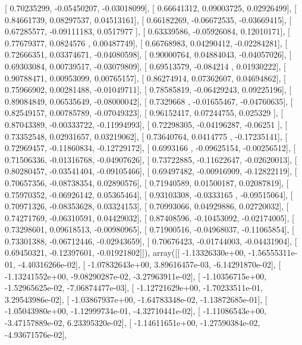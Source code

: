 \documentclass{article}
\begin{document}
       [ 0.70235299, -0.05450207, -0.03018099],
       [ 0.66641312,  0.09003725,  0.02926499],
       [ 0.84661739,  0.08297537,  0.04513161],
       [ 0.66182269, -0.06672535, -0.03669415],
       [ 0.67285577, -0.09111183,  0.0517977 ],
       [ 0.63339586, -0.05926084,  0.12010171],
       [ 0.77679377,  0.0824576 ,  0.00487749],
       [ 0.66768983,  0.04290412, -0.02284281],
       [ 0.72666351,  0.03374671, -0.04080598],
       [ 0.90000764,  0.04884043, -0.04057026],
       [ 0.69303084,  0.00739517, -0.03079809],
       [ 0.69513579, -0.084214  ,  0.01930222],
       [ 0.90788471,  0.00953099,  0.00765157],
       [ 0.86274914,  0.07362607,  0.04694862],
       [ 0.75966902,  0.00281488, -0.01049711],
       [ 0.78585819, -0.06429243,  0.09225196],
       [ 0.89084849,  0.06535649, -0.08000042],
       [ 0.7329668 , -0.01655467, -0.04760635],
       [ 0.82549157,  0.00785789, -0.07049323],
       [ 0.96152417,  0.07244755,  0.025329  ],
       [ 0.87043389, -0.00333722, -0.11994993],
       [ 0.72298305, -0.04196287, -0.06251   ],
       [ 0.73352548,  0.02931657,  0.03219062],
       [ 0.73640764,  0.0414775 , -0.17235141],
       [ 0.72969457, -0.11860834, -0.12729172],
       [ 0.6993166 , -0.09625154, -0.00256512],
       [ 0.71506336, -0.01316768, -0.04907626],
       [ 0.73722885, -0.11622647, -0.02620013],
       [ 0.80280457, -0.03541404, -0.09105466],
       [ 0.69497482, -0.00916909, -0.12822119],
       [ 0.70657356, -0.08738354,  0.02890576],
       [ 0.71940589,  0.01500187,  0.02087819],
       [ 0.75970352, -0.06926142,  0.05365464],
       [ 0.93103308, -0.0333165 , -0.09515064],
       [ 0.70971326, -0.08353628,  0.03324153],
       [ 0.70993066,  0.04929886,  0.02720032],
       [ 0.74271769, -0.06310591,  0.04429032],
       [ 0.87408596, -0.10453092, -0.02174005],
       [ 0.73298601,  0.09618513, -0.00980965],
       [ 0.71900516, -0.04968037, -0.11065854],
       [ 0.73301388, -0.06712446, -0.02943659],
       [ 0.70676423, -0.01744003, -0.04431904],
       [ 0.69450321, -0.12397601, -0.01921802]]), array([[ -1.13326330e+00,  -1.56555311e-01,  -4.40316266e-02],
       [ -1.07832643e+00,   3.89616457e-03,  -6.14291870e-02],
       [ -1.13241552e+00,  -9.08290287e-02,  -3.27963911e-02],
       [ -1.10356715e+00,  -1.52965625e-02,  -7.06874477e-03],
       [ -1.12721629e+00,  -1.70233511e-01,   3.29543986e-02],
       [ -1.03867937e+00,  -1.64783348e-02,  -1.13872685e-01],
       [ -1.05043980e+00,  -1.12999734e-01,  -4.32710441e-02],
       [ -1.11086543e+00,  -3.47157889e-02,   6.23395320e-02],
       [ -1.14611651e+00,  -1.27590384e-02,  -4.93671576e-02],
\end{document}
